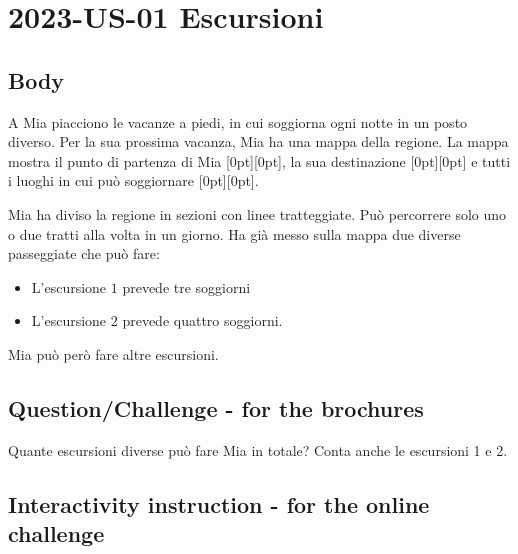 \documentclass[a4paper,11pt]{report}
\newcommand{\taskGraphicsFolder}{..}
\begin{document}
\section*{\centering{} 2023-US-01 Escursioni}


\subsection*{Body}

A Mia piacciono le vacanze a piedi, in cui soggiorna ogni notte in un posto diverso. Per la sua prossima vacanza, Mia ha una mappa della regione.
La mappa mostra il punto di partenza di Mia \raisebox{-0.5ex}[0pt][0pt]{}, la sua destinazione \raisebox{-0.5ex}[0pt][0pt]{} e tutti i luoghi in cui può soggiornare \raisebox{-0.5ex}[0pt][0pt]{}.

{\centering%
\par}

Mia ha diviso la regione in sezioni con linee tratteggiate. Può percorrere solo uno o due tratti alla volta in un giorno.
Ha già messo sulla mappa due diverse passeggiate che può fare:

\begin{itemize}
  \item L’escursione $1$ prevede tre soggiorni
  \item L’escursione $2$ prevede quattro soggiorni.
\end{itemize}

Mia può però fare altre escursioni.

{\em


\subsection*{Question/Challenge - for the brochures}

Quante escursioni diverse può fare Mia in totale?
Conta anche le escursioni 1 e 2.

}


\subsection*{Interactivity instruction - for the online challenge}
\end{document}
